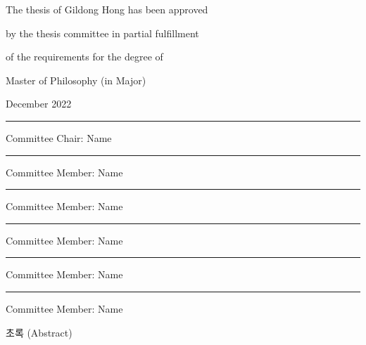 \documentclass[11pt]{report}
\numberwithin{figure}{chapter}
\theoremstyle{plain}
\theoremstyle{definition}
\theoremstyle{corollary}
\theoremstyle{definition}
\theoremstyle{plain}
\theoremstyle{definition}
\theoremstyle{plain}
\begin{document}
\newpage
\begin{center}
\Large
The thesis of Gildong Hong has been approved \par
by the thesis committee in partial fulfillment\par
of the requirements for the degree of \par
Master of Philosophy (in Major) 

\par\vspace{50pt}

\large December 2022

\par\vspace{50pt}

\rule{.6\textwidth}{0.4pt}\par
Committee Chair: Name

\par\vspace{20pt}
 
\rule{.6\textwidth}{0.4pt}\par
Committee Member: Name
 
\par\vspace{20pt}

\rule{.6\textwidth}{0.4pt}\par
Committee Member: Name 
 
\par\vspace{20pt}

\rule{.6\textwidth}{0.4pt}\par
Committee Member: Name 
 
\par\vspace{20pt}

\rule{.6\textwidth}{0.4pt}\par
Committee Member: Name 
 
\par\vspace{20pt}

\rule{.6\textwidth}{0.4pt}\par
Committee Member: Name 
\end{center}

\newpage
{}

\begin{center}
\large 초록 (Abstract)
\end{center}
\end{document}
